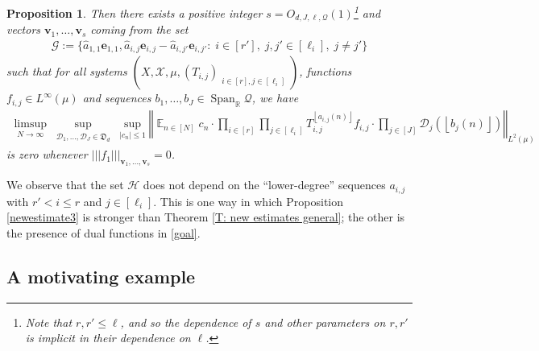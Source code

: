 \documentclass[11pt]{amsart}
\newtheorem{proposition}[lemma]{Proposition}
\theoremstyle{definition}
\DeclareMathOperator*{\E}{\mathbb{E}}
\newcommand{\R}{{\mathbb R}}
\newcommand{\CD}{{\mathcal D}}
\newcommand{\CG}{{\mathcal G}}
\newcommand{\CH}{{\mathcal H}}
\newcommand{\CQ}{{\mathcal Q}}
\newcommand{\CX}{{\mathcal X}}
\newcommand{\FD}{{\mathfrak D}}
\newcommand{\be}{{\mathbf{e}}}
\newcommand{\bv}{{\mathbf{v}}}
\newcommand{\norm}[1]{\left\Vert #1\right\Vert}
\newcommand{\nnorm}[1]{\lvert\!|\!| #1|\!|\!\rvert}
\newcommand{\1}{{\mathbf{1}}}
\DeclareMathOperator{\Span}{Span}
\newcommand{\floor}[1]{{\left \lfloor #1 \right \rfloor}}
\begin{document}
\begin{proposition}
         
                 Then there exists a positive integer $s=O_{d,J,\ell, \CQ}(1)$\footnote{Note that $r,r'\leq \ell$, and so the dependence of $s$ and other parameters on $r, r'$ is implicit in their dependence on $\ell$.} and vectors $\bv_{1},\dots,\bv_{s}$ coming from the set %
                 \begin{align*}
                     \CG:=\{\hat{a}_{1,1}\be_{1,1}, \hat{a}_{i,j}\be_{i,j}-\hat{a}_{i,j'}\be_{i,j'}:\; i\in[r'],\; j,j'\in[\ell_{i}],\; j\neq j'\}
                 \end{align*}
         such that for all systems $(X, \CX, \mu, (T_{i,j})_{\substack{i\in[r], j\in[\ell_i]}})$,  functions $f_{i,j}\in L^\infty(\mu)$ and sequences $b_1, \ldots, b_J\in\Span_\R\CQ$, we have 
\begin{multline}\label{goal}
         \limsup_{N\to\infty}\sup_{\substack{
         \CD_1, \ldots, \CD_J \in \FD_d}} \sup_{|c_n|\leq 1}\norm{\E_{n\in [N]} c_{n}\cdot \prod_{i\in[r]}\prod_{j\in[\ell_i]}  T_{i,j}^{\floor{a_{i,j}(n)}} f_{i,j} \cdot \prod_{j\in[J]}\CD_j(\floor{b_j(n)})}_{L^2(\mu)}%
    \end{multline}
    is zero whenever $\nnorm{f_1}_{\bv_{1},\dots,\bv_{s}}=0$. 
    \end{proposition}
We observe that the set $\CH$ does not depend on the ``lower-degree'' sequences $a_{i,j}$ with $r'<i\leq r$ and $j\in[\ell_i]$. This is one way in which Proposition \ref{newestimate3} is stronger than Theorem \ref{T: new estimates general}; the other is the presence of dual functions in \eqref{goal}.

\subsection{A motivating example}\label{SS: concatenation example}
\end{document}
